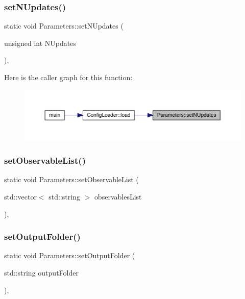 \subsubsection{\texorpdfstring{setNUpdates()}{setNUpdates()}}
{\footnotesize\ttfamily static void Parameters\+::set\+N\+Updates (\begin{DoxyParamCaption}\item[{unsigned int}]{N\+Updates }\end{DoxyParamCaption})\hspace{0.3cm}{\ttfamily [inline]}, {\ttfamily [static]}}

Here is the caller graph for this function\+:
\nopagebreak
\begin{figure}[H]
\begin{center}
\leavevmode
\includegraphics[width=350pt]{class_parameters_ae443546fea1f1ceaf3683cb368f7f5bb_icgraph}
\end{center}
\end{figure}
\mbox{\label{class_parameters_a6fb3ff88b2a2c9d5d4f2c3b64e672fa1}} 
\subsubsection{\texorpdfstring{setObservableList()}{setObservableList()}}
{\footnotesize\ttfamily static void Parameters\+::set\+Observable\+List (\begin{DoxyParamCaption}\item[{std\+::vector$<$ std\+::string $>$}]{observables\+List }\end{DoxyParamCaption})\hspace{0.3cm}{\ttfamily [inline]}, {\ttfamily [static]}}

\mbox{\label{class_parameters_a58dff6fbcc88bb916b9590057bf338ff}} 
\subsubsection{\texorpdfstring{setOutputFolder()}{setOutputFolder()}}
{\footnotesize\ttfamily static void Parameters\+::set\+Output\+Folder (\begin{DoxyParamCaption}\item[{std\+::string}]{output\+Folder }\end{DoxyParamCaption})\hspace{0.3cm}{\ttfamily [inline]}, {\ttfamily [static]}}


